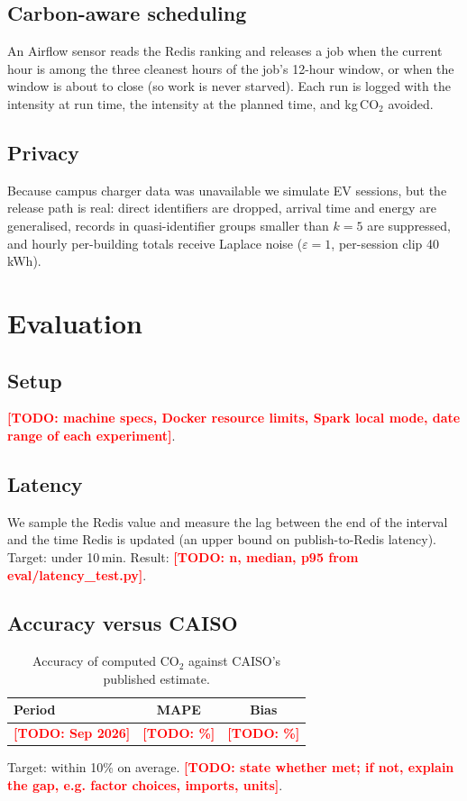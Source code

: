 \documentclass[conference]{IEEEtran}
\newcommand{\TODO}[1]{\textcolor{red}{\textbf{[TODO: #1]}}}   %
\begin{document}
\subsection{Carbon-aware scheduling}
An Airflow sensor reads the Redis ranking and releases a job when the current hour is among the three cleanest hours of the job's 12-hour window, or when the window is about to close (so work is never starved). Each run is logged with the intensity at run time, the intensity at the planned time, and kg\,CO$_2$ avoided.
\subsection{Privacy}
Because campus charger data was unavailable we simulate EV sessions, but the release path is real: direct identifiers are dropped, arrival time and energy are generalised, records in quasi-identifier groups smaller than $k=5$ are suppressed, and hourly per-building totals receive Laplace noise ($\varepsilon=1$, per-session clip 40\,kWh).

\section{Evaluation}
\subsection{Setup}
\TODO{machine specs, Docker resource limits, Spark local mode, date range of each experiment}.
\subsection{Latency}
We sample the Redis value and measure the lag between the end of the interval and the time Redis is updated (an upper bound on publish-to-Redis latency). Target: under 10\,min. Result: \TODO{n, median, p95 from eval/latency\_test.py}.
\subsection{Accuracy versus CAISO}
\begin{table}[t]\centering\caption{Accuracy of computed CO$_2$ against CAISO's published estimate.}
\begin{tabular}{lcc}\toprule Period & MAPE & Bias\\\midrule \TODO{Sep 2026} & \TODO{\%} & \TODO{\%}\\\bottomrule\end{tabular}\end{table}
Target: within 10\% on average. \TODO{state whether met; if not, explain the gap, e.g. factor choices, imports, units}.
\end{document}
